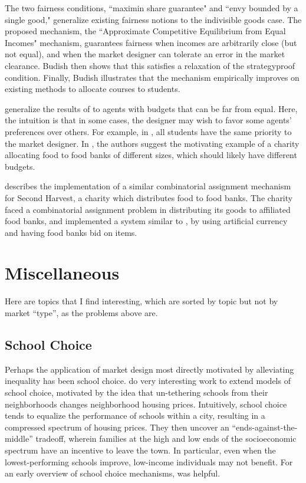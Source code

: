 \documentclass[JEL]{AEA}
\begin{document}
The two fairness conditions, ``maximin share guarantee" and ``envy bounded by a single good," generalize existing fairness notions to the indivisible goods case. The proposed mechanism, the ``Approximate Competitive Equilibrium from Equal Incomes" mechanism, guarantees fairness when incomes are arbitrarily close (but not equal), and when the market designer can tolerate an error in the market clearance. Budish then shows that this satisfies a relaxation of the strategyproof condition. Finally, Budish illustrates that the mechanism empirically improves on existing methods to allocate courses to students.

\cite{babaioff-2019} generalize the results of \cite{budish-2011} to agents with budgets that can be far from equal. Here, the intuition is that in some cases, the designer may wish to favor some agents' preferences over others. For example, in \cite{budish-2011}, all students have the same priority to the market designer. In \cite{babaioff-2019}, the authors suggest the motivating example of a charity allocating food to food banks of different sizes, which should likely have different budgets.

\cite{prendergast-2017} describes the implementation of a similar combinatorial assignment mechanism for Second Harvest, a charity which distributes food to food banks. The charity faced a combinatorial assignment problem in distributing its goods to affiliated food banks, and implemented a system similar to \cite{budish-2011}, by using artificial currency and having food banks bid on items.

\section{Miscellaneous}

Here are topics that I find interesting, which are sorted by topic but not by market ``type'', as the problems above are.

\subsection{School Choice}

Perhaps the application of market design most directly motivated by alleviating inequality has been school choice. \cite{avery-2020} do very interesting work to extend models of school choice, motivated by the idea that un-tethering schools from their neighborhoods changes neighborhood housing prices. Intuitively, school choice tends to equalize the performance of schools within a city, resulting in a compressed spectrum of housing prices. They then uncover an ``ends-against-the-middle'' tradeoff, wherein families at the high and low ends of the socioeconomic spectrum have an incentive to leave the town. In particular, even when the lowest-performing schools improve, low-income individuals may not benefit. For an early overview of school choice mechanisms, \cite{pathak-2011} was helpful.
\end{document}
